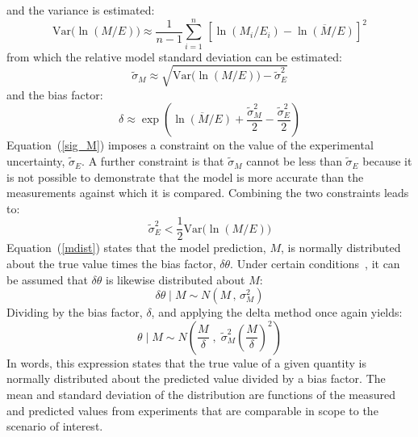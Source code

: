 \documentclass[fleqn,b5paper]{article}
\begin{document}
and the variance is estimated:
\begin{equation}
   \mathrm{Var} \Big( \ln (M/E) \Big) \approx \frac{1}{n-1} \sum_{i=1}^n \, \left[ \ln (M_i/E_i) - \overline{\ln (M/E)}  \right]^2 \label{stdev}
\end{equation}
from which the relative model standard deviation can be estimated:
\begin{equation}
   \widetilde{\sigma}_M \approx \sqrt{ \mathrm{Var}\Big( \ln (M/E) \Big) - \widetilde{\sigma}_E^2 } \label{sig_M}
\end{equation}
and the bias factor:
\begin{equation}
   \delta \approx \exp \left( \overline{\ln (M/E)} + \frac{ \widetilde{\sigma}_M^2}{2}-\frac{\widetilde{\sigma}_E^2}{2} \right) \label{delta}
\end{equation}
Equation~(\ref{sig_M}) imposes a constraint on the value of the experimental uncertainty, $\widetilde{\sigma}_E$. A further constraint is that $\widetilde{\sigma}_M$ cannot be less than $\widetilde{\sigma}_E$ because it is not possible to demonstrate that the model is more accurate than the measurements against which it is compared. Combining the two constraints leads to:
\begin{equation}
   \widetilde{\sigma}_E^2 < \frac{1}{2} \mathrm{Var}\Big( \ln (M/E) \Big)
\end{equation}
Equation~(\ref{mdist}) states that the model prediction, $M$, is normally distributed about the true value times the bias factor, $\delta \theta$. Under certain conditions~\cite{McGrattan:Metrologia}, it can be assumed that $\delta \theta$ is likewise distributed about $M$:
\begin{equation}
   \delta \theta \; | \; M \sim N \left(M \, , \, \sigma_M^2 \right) \label{thetaeq}
\end{equation}
Dividing by the bias factor, $\delta$, and applying the delta method once again yields:
\begin{equation}
   \theta \; | \; M \sim N \left( \frac{M}{\delta} \; , \; \widetilde{\sigma}_M^2 \left( \frac{M}{\delta} \right)^2 \right) \label{truth}
\end{equation}
In words, this expression states that the true value of a given quantity is normally distributed about the predicted value divided by a bias factor. The mean and standard deviation of the distribution are functions of the measured and predicted values from experiments that are comparable in scope to the scenario of interest. 
\end{document}
